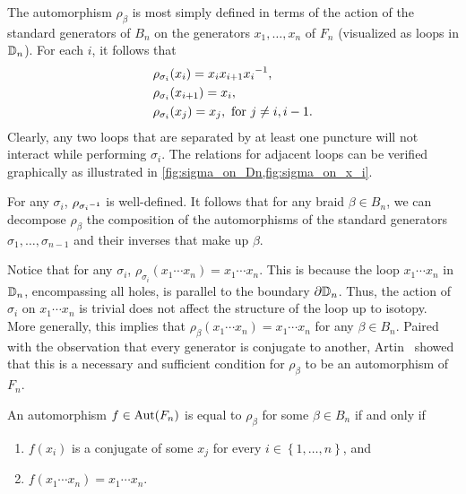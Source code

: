 The automorphism $\rho_\beta$ is most simply defined in terms of the action of the standard generators of $B_n$ on the generators $x_1,\dots,x_n$ of $F_n$ (visualized as loops in $\mathbb{D}_n$). For each $i$, it follows that
\begin{align}
    &\rho_{\sigma_i}(x_{i}) = x_{i}x_{i+1} { x_{i} }^{-1}, \label{eq:rho_i}\\
    &\rho_{\sigma_i}(x_{i+1}) = x_{i}, \label{eq:rho_ip1}\\
    &\rho_{\sigma_i}(x_j) = x_j, \textrm{ for } j\neq i,i-1.\label{eq:rho_j}
\end{align}
Clearly, any two loops that are separated by at least one puncture will not interact while performing $\sigma_i$. The relations for adjacent loops can be verified graphically as illustrated in \cref{fig:sigma_on_Dn,fig:sigma_on_x_i}.
\begin{figure}[htbp]
    \centering
    
    \label{fig:sigma_on_x_i}
\end{figure}

For any $\sigma_i$, $\rho_{{ \sigma_i }^{-1}}$ is well-defined. It follows that for any braid $\beta\in B_n$, we can decompose $\rho_\beta$ the composition of the automorphisms of the standard generators $\sigma_1,\dots,\sigma_{n-1}$ and their inverses that make up $\beta$. 

Notice that for any $\sigma_i$, $\rho_{\sigma_i}(x_1\cdots x_n) = x_1\cdots x_n$. This is because the loop $x_1\cdots x_n$ in $\mathbb{D}_n$, encompassing all holes, is parallel to the boundary $\partial\mathbb{D}_n$. Thus, the action of $\sigma_i$ on $x_1\cdots x_n$ is trivial does not affect the structure of the loop up to isotopy. More generally, this implies that $\rho_\beta(x_1\cdots x_n) = x_1\cdots x_n$ for any $\beta\in B_n$. Paired with the observation that every generator is conjugate to another, Artin~\cite{Artin1947} showed that this is a necessary and sufficient condition for $\rho_\beta$ to be an automorphism of $F_n$.

\begin{theorem}\label{thm:autFn}
    An automorphism $f\in\textrm{Aut}\!\left( F_n \right)$ is equal to $\rho_\beta$ for some $\beta\in B_n$ if and only if
    \begin{enumerate}
        \item $f(x_i)$ is a conjugate of some $x_j$ for every $i\in\left\{ 1,\dots,n \right\}$, and
        \item $f(x_1\cdots x_n) = x_1\cdots x_n$.
    \end{enumerate}
\end{theorem}

